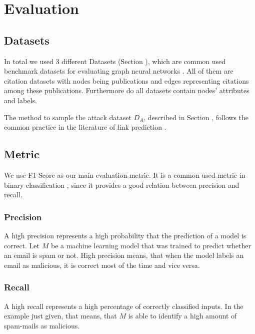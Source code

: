 \chapter{Evaluation}

    \section{Datasets}
        In total we used 3 different Datasets (Section ), which are common used benchmark datasets for evaluating graph neural networks \cite{acharya2019feature, gao2019graphnas, gcn}.
        All of them are citation datasets with nodes being publications and edges representing citations among these publications.        
        Furthermore do all datasets contain nodes' attributes and labels.

        The method to sample the attack dataset $D_A$, described in Section , follows the common practice in the literature of link prediction \cite{BHPZ17, grover2016node2vec}.

    \section{Metric}
        We use F1-Score as our main evaluation metric.
        It is a common used metric in binary classification \cite{lipton2014thresholding, santus2016features, woodbridge2016predicting}, since it provides a good relation between precision and recall.

        \subsection*{Precision}
            A high precision represents a high probability that the prediction of a model is correct.
            Let $M$ be a machine learning model that was trained to predict whether an email is spam or not.
            High precision means, that when the model labels an email as malicious, it is correct most of the time and vice versa.

        \subsection*{Recall}
            A high recall represents a high percentage of correctly classified inputs.
            In the example just given, that means, that $M$ is able to identify a high amount of spam-mails as malicious.



